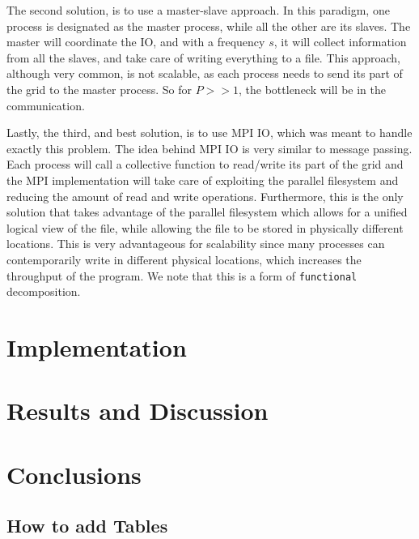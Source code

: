 \documentclass{report}
\begin{document}
The second solution, is to use a master-slave approach. In this paradigm, one 
process is designated as the master process, while all the other are its slaves. 
The master will coordinate the IO, and with a frequency $s$, it will collect 
information from all the slaves, and take care of writing everything to a file. 
This approach, although very common, is not scalable, as each process needs to 
send its part of the grid to the master process. So for $P>>1$, the bottleneck 
will be in the communication. 

Lastly, the third, and best solution, is to use MPI IO, which was meant to handle 
exactly this problem. The idea behind MPI IO is very similar to message passing. 
Each process will call a collective function to read/write its part of the grid
and the MPI implementation will take care of exploiting the parallel filesystem
and reducing the amount of read and write operations. Furthermore, this is 
the only solution that takes advantage of the parallel filesystem which allows 
for a unified logical view of the file, while allowing the file to be stored 
in physically different locations. This is very advantageous for scalability 
since many processes can contemporarily write in different physical locations, 
which increases the throughput of the program. We note that this is a form 
of \texttt{functional} decomposition.








\section{Implementation}

\section{Results and Discussion}

\section{Conclusions}

\subsection{How to add Tables}
\end{document}
